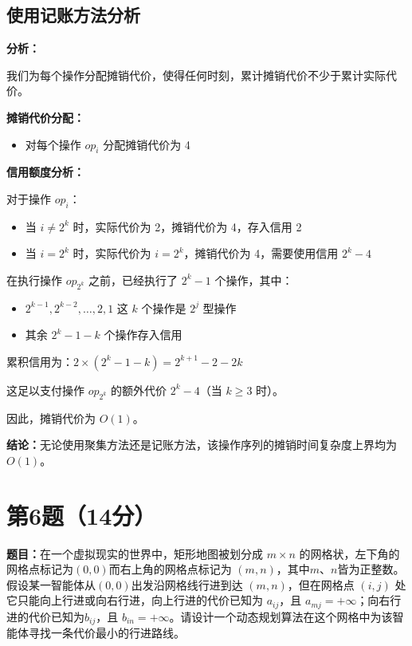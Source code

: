 \documentclass[UTF8,12pt,a4paper]{ctexart}
\begin{document}
\subsection*{使用记账方法分析}

\textbf{分析：}

我们为每个操作分配摊销代价，使得任何时刻，累计摊销代价不少于累计实际代价。

\textbf{摊销代价分配：}
\begin{itemize}
	\item 对每个操作 $op_i$ 分配摊销代价为 4
\end{itemize}

\textbf{信用额度分析：}

对于操作 $op_i$：
\begin{itemize}
	\item 当 $i \neq 2^k$ 时，实际代价为 2，摊销代价为 4，存入信用 2
	\item 当 $i = 2^k$ 时，实际代价为 $i = 2^k$，摊销代价为 4，需要使用信用 $2^k - 4$
\end{itemize}

在执行操作 $op_{2^k}$ 之前，已经执行了 $2^k - 1$ 个操作，其中：
\begin{itemize}
	\item $2^{k-1}, 2^{k-2}, \ldots, 2, 1$ 这 $k$ 个操作是 $2^j$ 型操作
	\item 其余 $2^k - 1 - k$ 个操作存入信用
\end{itemize}

累积信用为：$2 \times (2^k - 1 - k) = 2^{k+1} - 2 - 2k$

这足以支付操作 $op_{2^k}$ 的额外代价 $2^k - 4$（当 $k \geq 3$ 时）。

因此，摊销代价为 $O(1)$。

\textbf{结论：}无论使用聚集方法还是记账方法，该操作序列的摊销时间复杂度上界均为 $O(1)$。


\section*{第6题（14分）}
\textbf{题目：}在一个虚拟现实的世界中，矩形地图被划分成 $m \times n$ 的网格状，左下角的网格点标记为$(0,0)$而右上角的网格点标记为 $(m, n)$，其中$m$、$n$皆为正整数。假设某一智能体从$(0,0)$出发沿网格线行进到达 $(m, n)$，但在网格点 $(i, j)$ 处它只能向上行进或向右行进，向上行进的代价已知为 $a_{ij}$，且 $a_{mj}=+\infty$；向右行进的代价已知为$b_{ij}$，且 $b_{in}=+\infty$。请设计一个动态规划算法在这个网格中为该智能体寻找一条代价最小的行进路线。
\end{document}
